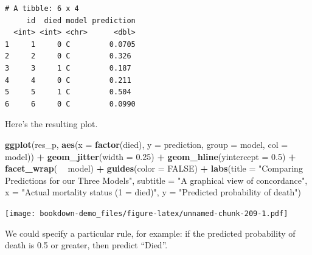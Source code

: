 \documentclass[]{book}
\newenvironment{Shaded}{\begin{snugshade}}{\end{snugshade}}
\newcommand{\KeywordTok}[1]{\textcolor[rgb]{0.13,0.29,0.53}{\textbf{#1}}}
\newcommand{\DataTypeTok}[1]{\textcolor[rgb]{0.13,0.29,0.53}{#1}}
\newcommand{\DecValTok}[1]{\textcolor[rgb]{0.00,0.00,0.81}{#1}}
\newcommand{\FloatTok}[1]{\textcolor[rgb]{0.00,0.00,0.81}{#1}}
\newcommand{\StringTok}[1]{\textcolor[rgb]{0.31,0.60,0.02}{#1}}
\newcommand{\OtherTok}[1]{\textcolor[rgb]{0.56,0.35,0.01}{#1}}
\newcommand{\OperatorTok}[1]{\textcolor[rgb]{0.81,0.36,0.00}{\textbf{#1}}}
\newcommand{\NormalTok}[1]{#1}
\theoremstyle{definition}
\theoremstyle{definition}
\theoremstyle{definition}
\theoremstyle{remark}
\begin{document}
\begin{verbatim}
# A tibble: 6 x 4
     id  died model prediction
  <int> <int> <chr>      <dbl>
1     1     0 C         0.0705
2     2     0 C         0.326 
3     3     1 C         0.187 
4     4     0 C         0.211 
5     5     1 C         0.504 
6     6     0 C         0.0990
\end{verbatim}

Here's the resulting plot.

\begin{Shaded}
\begin{Highlighting}[]
\KeywordTok{ggplot}\NormalTok{(res_p, }\KeywordTok{aes}\NormalTok{(}\DataTypeTok{x =} \KeywordTok{factor}\NormalTok{(died), }\DataTypeTok{y =}\NormalTok{ prediction, }
                  \DataTypeTok{group =}\NormalTok{ model, }\DataTypeTok{col =}\NormalTok{ model)) }\OperatorTok{+}
\StringTok{    }\KeywordTok{geom_jitter}\NormalTok{(}\DataTypeTok{width =} \FloatTok{0.25}\NormalTok{) }\OperatorTok{+}\StringTok{ }
\StringTok{    }\KeywordTok{geom_hline}\NormalTok{(}\DataTypeTok{yintercept =} \FloatTok{0.5}\NormalTok{) }\OperatorTok{+}
\StringTok{    }\KeywordTok{facet_wrap}\NormalTok{( }\OperatorTok{~}\StringTok{ }\NormalTok{model) }\OperatorTok{+}\StringTok{ }
\StringTok{    }\KeywordTok{guides}\NormalTok{(}\DataTypeTok{color =} \OtherTok{FALSE}\NormalTok{) }\OperatorTok{+}
\StringTok{    }\KeywordTok{labs}\NormalTok{(}\DataTypeTok{title =} \StringTok{"Comparing Predictions for our Three Models"}\NormalTok{,}
         \DataTypeTok{subtitle =} \StringTok{"A graphical view of concordance"}\NormalTok{,}
         \DataTypeTok{x =} \StringTok{"Actual mortality status (1 = died)"}\NormalTok{,}
         \DataTypeTok{y =} \StringTok{"Predicted probability of death"}\NormalTok{)}
\end{Highlighting}
\end{Shaded}

\texttt{[image: bookdown-demo\_files/figure-latex/unnamed-chunk-209-1.pdf]}

We could specify a particular rule, for example: if the predicted
probability of death is 0.5 or greater, then predict ``Died''.

\begin{Shaded}
\end{Shaded}
\end{document}
